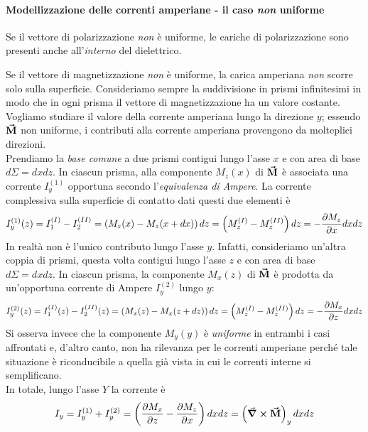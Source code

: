 \paragraph{Modellizzazione delle correnti amperiane - il caso \textit{non} uniforme}
\begin{remember}
	Se il vettore di polarizzazione \textit{non} è uniforme, le cariche di polarizzazione sono presenti anche all'\textit{interno} del dielettrico.
\end{remember}
\noindent Se il vettore di magnetizzazione \textit{non} è uniforme, la carica amperiana \textit{non} scorre solo sulla superficie. Consideriamo sempre la suddivisione in prismi infinitesimi in modo che in ogni prisma il vettore di magnetizzazione ha un valore costante. Vogliamo studiare il valore della corrente amperiana lungo la direzione $y$; essendo $\vb*{\va{M}}$ non uniforme, i contributi alla corrente amperiana provengono da molteplici direzioni.\\
Prendiamo la \textit{base comune} a due prismi contigui lungo l'asse $x$ e con area di base $d\Sigma=dxdz$. In ciascun prisma, alla componente $M_z(x)$ di $\vb*{\va{M}}$ è associata una corrente $I_y^{(1)}$ opportuna secondo l'\textit{equivalenza di Ampere}. La corrente complessiva sulla superficie di contatto dati questi due elementi è
\begin{equation*}
	I_y^{(1)}(z)=I_1^{(I)}-I_2^{(II)}=\left(M_z(x)-M_z(x+dx)\right)dz=\left(M_z^{(I)}-M_z^{(II)}\right)dz=-\pdv{M_z}{x}dxdz
\end{equation*}
In realtà non è l'unico contributo lungo l'asse $y$. Infatti, consideriamo un'altra coppia di prismi, questa volta contigui lungo l'asse $z$ e con area di base $d\Sigma=dxdz$. In ciascun prisma, la componente $M_x(z)$ di $\vb*{\va{M}}$ è prodotta da un'opportuna corrente di Ampere $I_y^{(2)}$ lungo $y$:
\begin{equation*}
	I_y^{(2)}(z)=I_1^{(I)}(z)-I_2^{(II)}(z)=\left(M_x(z)-M_x(z+dz)\right)dz=\left(M_z^{(I)}-M_z^{(II)}\right)dz=-\pdv{M_x}{z}dxdz
\end{equation*}
Si osserva invece che la componente $M_y(y)$ è \textit{uniforme} in entrambi i casi affrontati e, d'altro canto, non ha rilevanza per le correnti amperiane perché tale situazione è riconducibile a quella già vista in cui le correnti interne si semplificano.\\
In totale, lungo l'asse $Y$ la corrente è
\begin{equation}
	I_y=I_y^{(1)}+I_y^{(2)}=\left(\pdv{M_x}{z}-\pdv{M_z}{x}\right)dxdz=\left(\curl{\vb*{\va{M}}}\right)_ydxdz
\end{equation}
